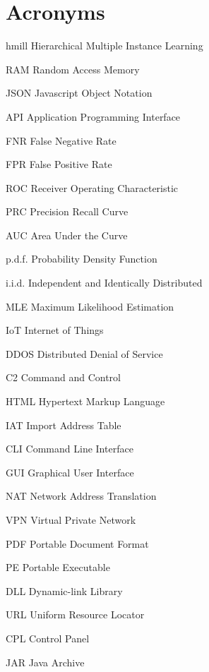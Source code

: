 \chapter*{Acronyms}
\begin{abbrv}
    \item[hmill]        Hierarchical Multiple Instance Learning
    \item[RAM]          Random Access Memory
    \item[JSON]         Javascript Object Notation
    \item[API]          Application Programming Interface
    \item[FNR]          False Negative Rate
    \item[FPR]          False Positive Rate
    \item[ROC]          Receiver Operating Characteristic
    \item[PRC]          Precision Recall Curve
    \item[AUC]          Area Under the Curve
    \item[p.d.f.]       Probability Density Function
    \item[i.i.d.]       Independent and Identically Distributed
    \item[MLE]          Maximum Likelihood Estimation
    \item[IoT]          Internet of Things
    \item[DDOS]         Distributed Denial of Service
    \item[C2]           Command and Control
    \item[HTML]         Hypertext Markup Language
    \item[IAT]          Import Address Table
    \item[CLI]          Command Line Interface
    \item[GUI]          Graphical User Interface
    \item[NAT]          Network Address Translation
    \item[VPN]          Virtual Private Network
    \item[PDF]          Portable Document Format
    \item[PE]           Portable Executable
    \item[DLL]          Dynamic-link Library
    \item[URL]          Uniform Resource Locator
    \item[CPL]          Control Panel        
    \item[JAR]          Java Archive

\end{abbrv}
